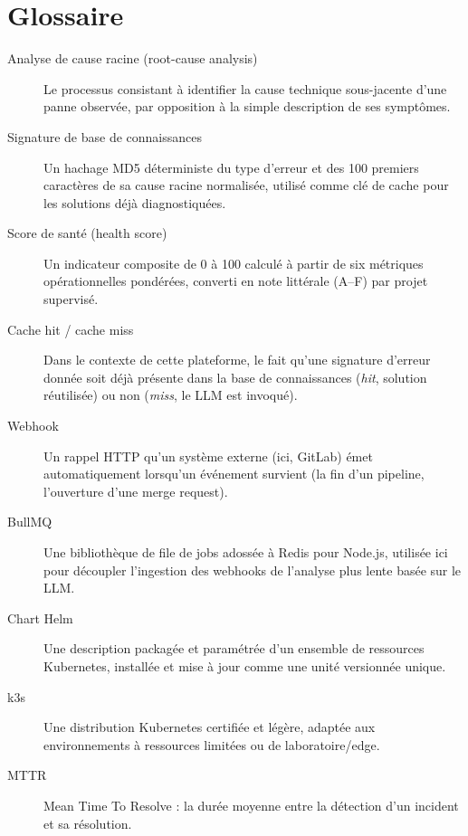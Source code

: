 \documentclass[12pt,a4paper,oneside]{report}
\begin{document}
\chapter{Glossaire}\label{app:glossary}
\begin{description}
\item[Analyse de cause racine (root-cause analysis)] Le processus consistant à identifier la cause technique sous-jacente d'une panne observée, par opposition à la simple description de ses symptômes.
\item[Signature de base de connaissances] Un hachage MD5 déterministe du type d'erreur et des 100 premiers caractères de sa cause racine normalisée, utilisé comme clé de cache pour les solutions déjà diagnostiquées.
\item[Score de santé (health score)] Un indicateur composite de 0 à 100 calculé à partir de six métriques opérationnelles pondérées, converti en note littérale (A--F) par projet supervisé.
\item[Cache hit / cache miss] Dans le contexte de cette plateforme, le fait qu'une signature d'erreur donnée soit déjà présente dans la base de connaissances (\emph{hit}, solution réutilisée) ou non (\emph{miss}, le LLM est invoqué).
\item[Webhook] Un rappel HTTP qu'un système externe (ici, GitLab) émet automatiquement lorsqu'un événement survient (la fin d'un pipeline, l'ouverture d'une merge request).
\item[BullMQ] Une bibliothèque de file de jobs adossée à Redis pour Node.js, utilisée ici pour découpler l'ingestion des webhooks de l'analyse plus lente basée sur le LLM.
\item[Chart Helm] Une description packagée et paramétrée d'un ensemble de ressources Kubernetes, installée et mise à jour comme une unité versionnée unique.
\item[k3s] Une distribution Kubernetes certifiée et légère, adaptée aux environnements à ressources limitées ou de laboratoire/edge.
\item[MTTR] Mean Time To Resolve : la durée moyenne entre la détection d'un incident et sa résolution.
\end{description}
\end{document}
